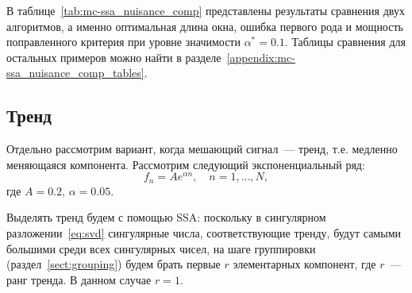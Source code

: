 \documentclass[specialist,
substylefile = spbu.rtx,
               subf,href,colorlinks=true,12pt]{disser}
\theoremstyle{definition}
\begin{document}
В таблице~\ref{tab:mc-ssa_nuisance_comp} представлены результаты сравнения двух алгоритмов, а именно оптимальная длина окна, ошибка первого рода и мощность поправленного критерия при уровне значимости $\alpha^*=0.1$. Таблицы сравнения для остальных примеров можно найти в разделе~\ref{appendix:mc-ssa_nuisance_comp_tables}.

\subsection{Тренд}\label{sect:trend}
Отдельно рассмотрим вариант, когда мешающий сигнал~--- тренд, т.е. медленно меняющаяся компонента. Рассмотрим следующий экспоненциальный ряд:
\[
	f_n=A e^{\alpha n},\quad n=1,\ldots,N,
\]
где $A=0.2$, $\alpha=0.05$.

Выделять тренд будем с помощью SSA: поскольку в сингулярном разложении~\eqref{eq:svd} сингулярные числа, соответствующие тренду, будут самыми большими среди всех сингулярных чисел, на шаге группировки (раздел~\ref{sect:grouping}) будем брать первые $r$ элементарных компонент, где $r$~--- ранг тренда. В данном случае $r=1$.
\end{document}
